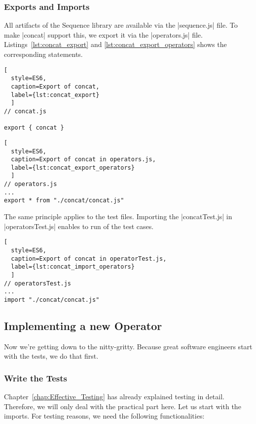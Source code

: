 \subsubsection{Exports and Imports}
\label{subsub:Exports and Imports}
All artifacts of the Sequence library are available via the |sequence.js| file.
To make |concat| support this, we export it via the |operators.js| file.
Listings~\ref{lst:concat_export} and \ref{lst:concat_export_operators} shows the corresponding statements.

\begin{lstlisting}[
  style=ES6, 
  caption=Export of concat,
  label={lst:concat_export}
  ]
// concat.js

export { concat }
\end{lstlisting}



\begin{lstlisting}[
  style=ES6, 
  caption=Export of concat in operators.js,
  label={lst:concat_export_operators}
  ]
// operators.js
...
export * from "./concat/concat.js"
\end{lstlisting}

The same principle applies to the test files. Importing the |concatTest.js| in
|operatorsTest.js| enables to run of the test cases.

\begin{lstlisting}[
  style=ES6, 
  caption=Export of concat in operatorTest.js,
  label={lst:concat_import_operators}
  ]
// operatorsTest.js
...
import "./concat/concat.js"
\end{lstlisting}

\subsection{Implementing a new Operator}
\label{subsub:Implementing a new Operator}
Now we're getting down to the nitty-gritty.
Because great software engineers start with the tests, we do that first.

\subsubsection{Write the Tests}
\label{subsub:Write the Tests}
Chapter~\ref{chap:Effective_Testing} has already explained testing in detail. Therefore, we will only deal 
with the practical part here.
\newline
Let us start with the imports. For testing reasons, we need the following
functionalities:

